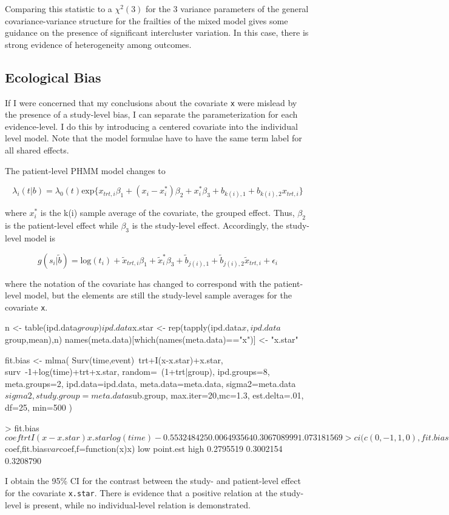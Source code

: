 Comparing this statistic to a $\chi^2(3)$ for the 3 variance parameters of the
general covariance-variance structure for the frailties of the mixed
model gives some guidance on the presence of significant intercluster
variation. In this case, there is strong evidence of heterogeneity
among outcomes.

\subsection{Ecological Bias}

If I were concerned that my conclusions about the covariate \texttt{x}
were mislead by the presence of a study-level bias, I can separate
the parameterization for each evidence-level. I do this by
introducing a centered covariate into the individual level model. Note
that the model formulae have to have the same term label for all
shared effects.

The patient-level PHMM model changes to

\[
\lambda_i(t|b) = \lambda_0(t) \mbox{exp}\lbrace x_{trt,i} \beta_1 +
(x_i - x_i^{*}) \beta_2 + x_i^{*} \beta_3 + b_{k(i),1} + b_{k(i),2} x_{trt,i} \rbrace
\]

\noindent where $x_i^{*}$ is the k(i) sample average of the covariate,
the grouped effect. Thus, $\beta_2$ is the patient-level effect while
$\beta_3$ is the study-level effect. Accordingly, the study-level
model is

\[
g(s_i|\tilde{b}) = \mbox{log}(t_i) + \tilde{x}_{trt,i} \beta_1 +
\tilde{x}_i^{*} \beta_3 + \tilde{b}_{j(i),1}+\tilde{b}_{j(i),2} \tilde{x}_{trt,i} +\epsilon_i
\]

\noindent where the notation of the covariate has changed to
correspond with the patient-level model, but the elements are still
the study-level sample averages for the covariate \texttt{x}.

\begin{Schunk}
\begin{Sinput}
n <- table(ipd.data$group)
ipd.data$x.star <- rep(tapply(ipd.data$x,ipd.data$group,mean),n)
names(meta.data)[which(names(meta.data)=="x")] <- "x.star"

fit.bias <- mlma(
    Surv(time,event)~trt+I(x-x.star)+x.star,
    surv~-1+log(time)+trt+x.star,
    random=~(1+trt|group),
    ipd.groups=8,
    meta.groups=2,
    ipd.data=ipd.data,
    meta.data=meta.data,
    sigma2=meta.data$sigma2,
    study.group=meta.data$sub.group,
    max.iter=20,mc=1.3,
    est.delta=.01,
    df=25,
    min=500
)

> fit.bias$coef
          trt I(x - x.star)        x.star     log(time) 
 -0.553248425   0.006493564   0.306708999   1.073181569 

> ci(c(0,-1,1,0),fit.bias$coef,fit.bias$var$coef,f=function(x){x})
      low point.est      high 
0.2795519 0.3002154 0.3208790 
\end{Sinput}
\end{Schunk}

I obtain the 95\% CI for the contrast between the study- and
patient-level effect for the covariate \texttt{x.star}. There is evidence
that a positive relation at the study-level is present, while no
individual-level relation is demonstrated.
